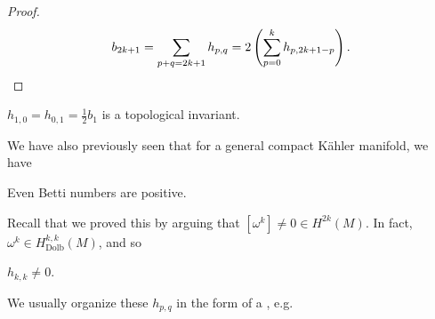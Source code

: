 \documentclass[a4paper]{article}
\newcommand\Dolb{\mathrm{Dolb}}
\begin{document}
\begin{proof}
  \[
    b_{2k + 1} = \sum_{p + q = 2k + 1} h_{p, q} = 2 \left(\sum_{p = 0}^k h_{p, 2k + 1 - p}\right).\qedhere
  \]
\end{proof}

\begin{cor}
  $h_{1, 0} = h_{0, 1} = \frac{1}{2}b_1$ is a topological invariant.
\end{cor}

We have also previously seen that for a general compact K\"ahler manifold, we have
\begin{prop}
  Even Betti numbers are positive.
\end{prop}

Recall that we proved this by arguing that $[\omega^k] \not= 0 \in H^{2k}(M)$. In fact, $\omega^k \in H^{k, k}_{\Dolb}(M)$, and so
\begin{prop}
  $h_{k, k} \not= 0$.\fakeqed %
\end{prop}

We usually organize these $h_{p, q}$ in the form of a , e.g.
\begin{center}
\end{center}

%
%
\end{document}

